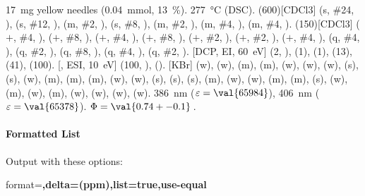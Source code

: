 \documentclass[load-preamble+]{cnltx-doc}
\begin{document}
\begin{experimental}[delta=(ppm),pos-number=sub,use-equal]
   \SI{17}{\milli\gram} yellow needles (\SI{0.04}{\milli\mole},
  \SI{13}{\percent}).
   \SI{277}{\celsius} (DSC).
  \NMR(600)[CDCl3]  (s, \#{24}, ),  (s, \#{12},
  ),  (m, \#{2}, ),  (s, \#{8},
  ),  (m, \#{2}, ),  (m, \#{4},
  ),  (m, \#{4}, ).
  (150)[CDCl3]  ($+$, \#{4}, ),  ($+$,
  \#{8}, ),  ($+$, \#{4}, ),  ($+$, \#{8},
  ),  ($+$, \#{2}, ),  ($+$, \#{2},
  ),  ($+$, \#{4}, ),  (q, \#{4},
  ),  (q, \#{2}, ),  (q, \#{8}, ),
   (q, \#{4}, ),  (q, \#{2}, ).
  [DCP, EI, \SI{60}{\electronvolt}]  (2, ), 
  (1),  (1),  (13),  (41),  (100).
  [, ESI, \SI{10}{\electronvolt}]  (100,
  ),  ().
  [KBr]  (w),  (w),  (m), 
  (m),  (w),  (w),  (w),  (s),
   (s),  (w),  (m),  (m), 
  (m),  (w),  (w),  (s),  (s),
   (s),  (m),  (w),  (w), 
  (m),  (m),  (s),  (w),  (m), 
  (w),  (m),  (w),  (w),  (w), 
  (w).
   \SI{386}{\nano\metre} ($\varepsilon = \val{65984}$),
  \SI{406}{\nano\metre} ($\varepsilon = \val{65378}$).
   $\Phi = \val{0.74+-0.1}$\,.
\end{experimental}

\paragraph{Formatted List}
Output with these options:

\begin{sourcecode}
  format=\bfseries,delta=(ppm),list=true,use-equal
\end{sourcecode}
\end{document}
